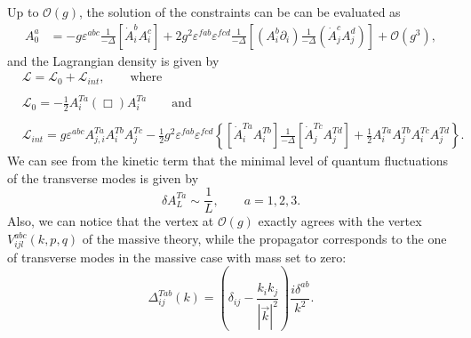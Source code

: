 \documentclass{article}
\begin{document}
Up to $\mathcal{O}\left(g\right)$, the solution of the constraints can be can be evaluated as 
\begin{equation}
\begin{split}
    A_0^a&= -g\varepsilon^{abc}\frac{1}{-\Delta}\left[\dot{A}_i^bA_i^c\right]
    +2g^2\varepsilon^{fab}\varepsilon^{fcd}\frac{1}{-\Delta}\left[(A_i^b\partial_i)\frac{1}{-\Delta}\left(\dot{A}_j^cA_j^d\right)\right]
    +\mathcal{O}(g^3),
\end{split}
\end{equation}
and the Lagrangian density is given by 
\begin{equation}
\begin{split}
        &\mathcal{L}=\mathcal{L}_0+\mathcal{L}_{int},\qquad\text{where}\\\\
        &\mathcal{L}_0=-\frac{1}{2}A_i^{Ta}(\Box)A_i^{Ta}\qquad\text{and}\\\\
        &\mathcal{L}_{int}=g\varepsilon^{abc}A_{j,i}^{Ta}A_i^{Tb}A_j^{Tc}-\frac{1}{2}g^2\varepsilon^{fab}\varepsilon^{fcd}\left\{\left[\dot{A}_i^{Ta}A^{Tb}_i\right]\frac{1}{-\Delta}\left[\dot{A}_j^{Tc}A^{Td}_j\right]+\frac{1}{2}A_i^{Ta}A_j^{Tb}A_i^{Tc}A_j^{Td}\right\}.
\end{split}
\end{equation}
We can see from the kinetic term  that the minimal level of quantum fluctuations of the transverse modes is given by
\begin{equation}
    \delta A_L^{Ta}\sim\frac{1}{L},  \quad\text{}\quad a=1,2,3.
\end{equation}
Also, we can notice that the vertex at $\mathcal{O}(g)$ exactly agrees with the vertex $V_{ijl}^{abc}(k,p,q)$ of the massive theory, while the propagator corresponds to the one of transverse modes in the massive case with mass set to zero:
\begin{equation*}
    \Delta_{ij}^{Tab}(k)=\left(\delta_{ij}-\frac{k_ik_j}{|\vec{k}|^2}\right)\frac{i\delta^{ab}}{k^2}.
\end{equation*}
\end{document}

